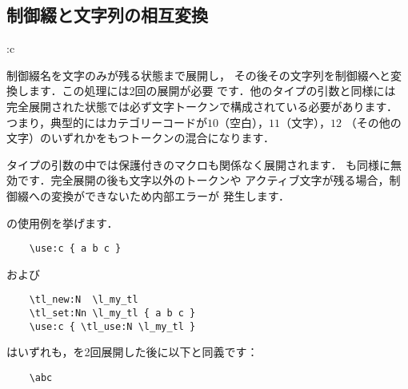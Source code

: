 \documentclass[uplatex,dvipdfmx,full,kernel]{wtpl3doc}
\begin{document}
\begin{documentation}
\subsection{制御綴と文字列の相互変換}

\begin{function}[EXP]{\use:c}
  \begin{syntax}
     
  \end{syntax}
  制御綴名を文字のみが残る状態まで展開し，
  その後その文字列を制御綴へと変換します．この処理には2回の展開が必要
  です．他のタイプの引数と同様には
  完全展開された状態では必ず文字トークンで構成されている必要があります．
  つまり，典型的にはカテゴリーコードが$10$（空白），$11$（文字），$12$
  （その他の文字）のいずれかをもつトークンの混合になります．
%
  \begin{texnote}
    タイプの引数の中では保護付きのマクロも関係なく展開されます．
    も同様に無効です．完全展開の後も文字以外のトークンや
    アクティブ文字が残る場合，制御綴への変換ができないため内部エラーが
    発生します．
  \end{texnote}
\end{function}

の使用例を挙げます．
%
  \begin{verbatim}
    \use:c { a b c }
  \end{verbatim}
%
  および
%
  \begin{verbatim}
    \tl_new:N  \l_my_tl
    \tl_set:Nn \l_my_tl { a b c }
    \use:c { \tl_use:N \l_my_tl }
  \end{verbatim}
%
  はいずれも，を2回展開した後に以下と同義です：
%
  \begin{verbatim}
    \abc
  \end{verbatim}


\end{documentation}
\end{document}
